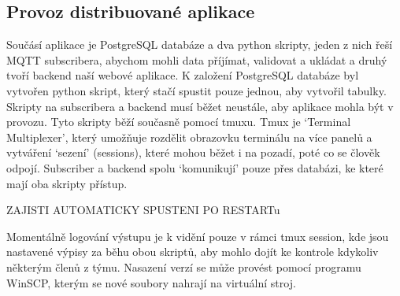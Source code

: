 \subsection{Provoz distribuované aplikace}
Součásí aplikace je PostgreSQL databáze a dva python skripty, jeden z nich řeší MQTT subscribera, abychom mohli data příjímat, validovat a ukládat a druhý tvoří backend naší webové aplikace.
K založení PostgreSQL databáze byl vytvořen python skript, který stačí spustit pouze jednou, aby vytvořil tabulky. Skripty na subscribera a backend musí běžet neustále, aby aplikace mohla být v provozu.
Tyto skripty běží současně pomocí tmuxu. Tmux je `Terminal Multiplexer', který umožňuje rozdělit obrazovku terminálu na více panelů a vytváření `sezení' (sessions), které mohou běžet i na pozadí, poté co se člověk odpojí.
Subscriber a backend spolu `komunikují' pouze přes databázi, ke které mají oba skripty přístup.

ZAJISTI AUTOMATICKY SPUSTENI PO RESTARTu

Momentálně logování výstupu je k vidění pouze v rámci tmux session, kde jsou nastavené výpisy za běhu obou skriptů, aby mohlo dojít ke kontrole kdykoliv některým členů z týmu. 
Nasazení verzí se může provést pomocí programu WinSCP, kterým se nové soubory nahrají na virtuální stroj.